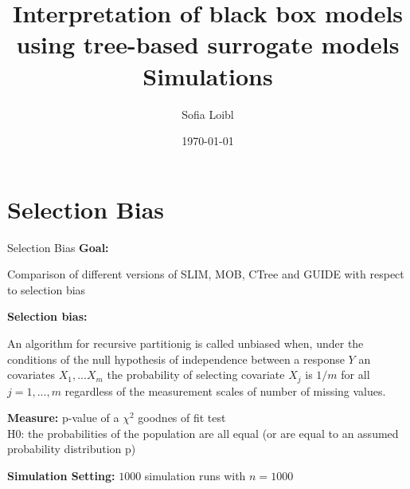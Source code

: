 \documentclass[9pt, xcolor=table]{beamer}
\title[Interpretation of black box models]{Interpretation of black box models using tree-based surrogate models \newline \small{Simulations}}
\author[Sofia Loibl]{Sofia Loibl}
\institute[LMU]{LMU München}
\date{\today}
\begin{document}
\begin{frame}
\titlepage 
\end{frame}


\section{Selection Bias}
\begin{frame}{Selection Bias}
\textbf{Goal:} 

Comparison of different versions of SLIM, MOB, CTree and GUIDE with respect to selection bias
\vspace{0.5cm}


\textbf{Selection bias:} 

An algorithm for recursive partitionig is called unbiased when, under the conditions of the null hypothesis of independence between a response $Y$ an covariates $X_{1},...X_{m}$ the probability of selecting covariate $X_{j}$ is $1/m$ for all $j = 1,...,m$ regardless of the measurement scales of number of missing values. \citep{Hothorn.2006}
\vspace{0.5cm}

\textbf{Measure:} p-value of a $\chi^2$ goodnes of fit test\\
H0: the probabilities of the population are all equal (or are equal to an assumed probability distribution p)
\vspace{0.5cm}

\textbf{Simulation Setting:} $1000$ simulation runs with $n= 1000$
\end{frame}
\end{document}
